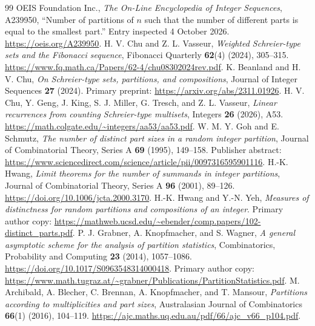 \documentclass[11pt,letterpaper]{article}
\numberwithin{equation}{section}
\theoremstyle{definition}\newtheorem{definition}[theorem]{Definition}
\theoremstyle{remark}\newtheorem{remark}[theorem]{Remark}
\begin{document}
\begin{thebibliography}{99}
 OEIS Foundation Inc., \emph{The On-Line Encyclopedia of Integer Sequences}, A239950, ``Number of partitions of $n$ such that the number of different parts is equal to the smallest part.'' Entry inspected 4 October 2026. \url{https://oeis.org/A239950}.
 H. V. Chu and Z. L. Vasseur, \emph{Weighted Schreier-type sets and the Fibonacci sequence}, Fibonacci Quarterly \textbf{62}(4) (2024), 305--315. \url{https://www.fq.math.ca/Papers/62-4/chu08302024rev.pdf}.
 K. Beanland and H. V. Chu, \emph{On Schreier-type sets, partitions, and compositions}, Journal of Integer Sequences \textbf{27} (2024). Primary preprint: \url{https://arxiv.org/abs/2311.01926}.
 H. V. Chu, Y. Geng, J. King, S. J. Miller, G. Tresch, and Z. L. Vasseur, \emph{Linear recurrences from counting Schreier-type multisets}, Integers \textbf{26} (2026), A53. \url{https://math.colgate.edu/~integers/aa53/aa53.pdf}.
 W. M. Y. Goh and E. Schmutz, \emph{The number of distinct part sizes in a random integer partition}, Journal of Combinatorial Theory, Series A \textbf{69} (1995), 149--158. Publisher abstract: \url{https://www.sciencedirect.com/science/article/pii/0097316595901116}.
 H.-K. Hwang, \emph{Limit theorems for the number of summands in integer partitions}, Journal of Combinatorial Theory, Series A \textbf{96} (2001), 89--126. \url{https://doi.org/10.1006/jcta.2000.3170}.
 H.-K. Hwang and Y.-N. Yeh, \emph{Measures of distinctness for random partitions and compositions of an integer}. Primary author copy: \url{https://mathweb.ucsd.edu/~ebender/comp.papers/102-distinct_parts.pdf}.
 P. J. Grabner, A. Knopfmacher, and S. Wagner, \emph{A general asymptotic scheme for the analysis of partition statistics}, Combinatorics, Probability and Computing \textbf{23} (2014), 1057--1086. \url{https://doi.org/10.1017/S0963548314000418}. Primary author copy: \url{https://www.math.tugraz.at/~grabner/Publications/PartitionStatistics.pdf}.
 M. Archibald, A. Blecher, C. Brennan, A. Knopfmacher, and T. Mansour, \emph{Partitions according to multiplicities and part sizes}, Australasian Journal of Combinatorics \textbf{66}(1) (2016), 104--119. \url{https://ajc.maths.uq.edu.au/pdf/66/ajc_v66_p104.pdf}.
\end{thebibliography}
\end{document}

